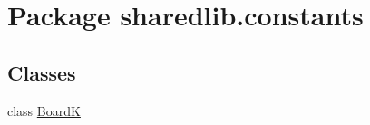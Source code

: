 \hypertarget{namespacesharedlib_1_1constants}{}\section{Package sharedlib.\+constants}
\label{namespacesharedlib_1_1constants}
\subsection*{Classes}
\begin{DoxyCompactItemize}
\item 
class \hyperlink{classsharedlib_1_1constants_1_1_board_k}{BoardK}
\end{DoxyCompactItemize}
